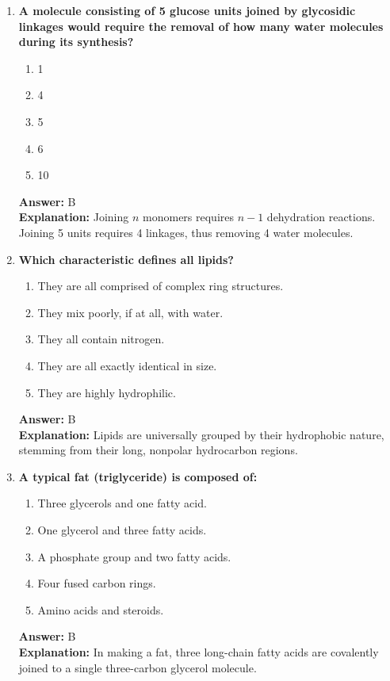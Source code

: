 \documentclass[11pt, a4paper]{article}
\begin{document}
\begin{enumerate}
\item \textbf{A molecule consisting of 5 glucose units joined by glycosidic linkages would require the removal of how many water molecules during its synthesis?}
\begin{enumerate}[label=\Alph*.]
    \item 1
    \item 4
    \item 5
    \item 6
    \item 10
\end{enumerate}
\textbf{Answer:} B \\
\textbf{Explanation:} Joining $n$ monomers requires $n-1$ dehydration reactions. Joining 5 units requires 4 linkages, thus removing 4 water molecules.


\item \textbf{Which characteristic defines all lipids?}
\begin{enumerate}[label=\Alph*.]
    \item They are all comprised of complex ring structures.
    \item They mix poorly, if at all, with water.
    \item They all contain nitrogen.
    \item They are all exactly identical in size.
    \item They are highly hydrophilic.
\end{enumerate}
\textbf{Answer:} B \\
\textbf{Explanation:} Lipids are universally grouped by their hydrophobic nature, stemming from their long, nonpolar hydrocarbon regions.

\item \textbf{A typical fat (triglyceride) is composed of:}
\begin{enumerate}[label=\Alph*.]
    \item Three glycerols and one fatty acid.
    \item One glycerol and three fatty acids.
    \item A phosphate group and two fatty acids.
    \item Four fused carbon rings.
    \item Amino acids and steroids.
\end{enumerate}
\textbf{Answer:} B \\
\textbf{Explanation:} In making a fat, three long-chain fatty acids are covalently joined to a single three-carbon glycerol molecule.


\end{enumerate}
\end{document}
